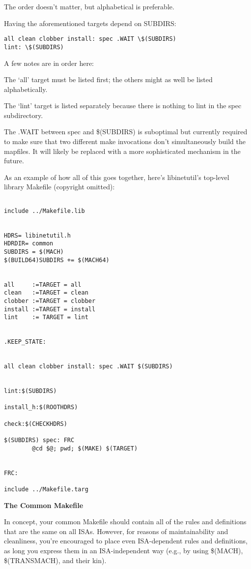 \documentclass{article}
\begin{document}
The order doesn't matter, but alphabetical is preferable.

Having the aforementioned targets depend on SUBDIRS:

\begin{verbatim}
all clean clobber install: spec .WAIT \$(SUBDIRS)
lint: \$(SUBDIRS)
\end{verbatim}

A few notes are in order here:

The `all' target must be listed first; the others might as well be listed
alphabetically.

The `lint' target is listed separately because there is nothing to lint in the
spec subdirectory.

The .WAIT between spec and \$(SUBDIRS) is suboptimal but currently required to
make sure that two different make invocations don't simultaneously build the
mapfiles. It will likely be replaced with a more sophisticated mechanism in the
future.

As an example of how all of this goes together, here's libinetutil's top-level
library Makefile (copyright omitted):

\begin{verbatim}

include ../Makefile.lib


HDRS= libinetutil.h
HDRDIR= common
SUBDIRS = $(MACH)
$(BUILD64)SUBDIRS += $(MACH64)


all     :=TARGET = all
clean   :=TARGET = clean
clobber :=TARGET = clobber
install :=TARGET = install
lint    := TARGET = lint


.KEEP_STATE:


all clean clobber install: spec .WAIT $(SUBDIRS)


lint:$(SUBDIRS)

install_h:$(ROOTHDRS)

check:$(CHECKHDRS)

$(SUBDIRS) spec: FRC
        @cd $@; pwd; $(MAKE) $(TARGET)


FRC:

include ../Makefile.targ

\end{verbatim}

{\bf The Common Makefile}

\vspace{0.1cm}
In concept, your common Makefile should contain all of the rules and
definitions that are the same on all ISAs. However, for reasons of
maintainability and cleanliness, you're encouraged to place even ISA-dependent
rules and definitions, as long you express them in an ISA-independent way
(e.g., by using \$(MACH), \$(TRANSMACH), and their kin).
\end{document}
